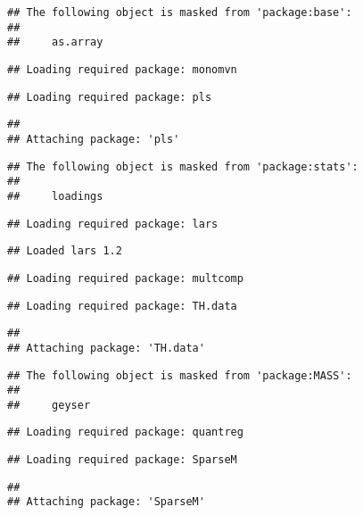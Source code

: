 \documentclass[11pt,]{article}
\begin{document}
\begin{verbatim}
## The following object is masked from 'package:base':
## 
##     as.array
\end{verbatim}

\begin{verbatim}
## Loading required package: monomvn
\end{verbatim}

\begin{verbatim}
## Loading required package: pls
\end{verbatim}

\begin{verbatim}
## 
## Attaching package: 'pls'
\end{verbatim}

\begin{verbatim}
## The following object is masked from 'package:stats':
## 
##     loadings
\end{verbatim}

\begin{verbatim}
## Loading required package: lars
\end{verbatim}

\begin{verbatim}
## Loaded lars 1.2
\end{verbatim}

\begin{verbatim}
## Loading required package: multcomp
\end{verbatim}

\begin{verbatim}
## Loading required package: TH.data
\end{verbatim}

\begin{verbatim}
## 
## Attaching package: 'TH.data'
\end{verbatim}

\begin{verbatim}
## The following object is masked from 'package:MASS':
## 
##     geyser
\end{verbatim}

\begin{verbatim}
## Loading required package: quantreg
\end{verbatim}

\begin{verbatim}
## Loading required package: SparseM
\end{verbatim}

\begin{verbatim}
## 
## Attaching package: 'SparseM'
\end{verbatim}
\end{document}
